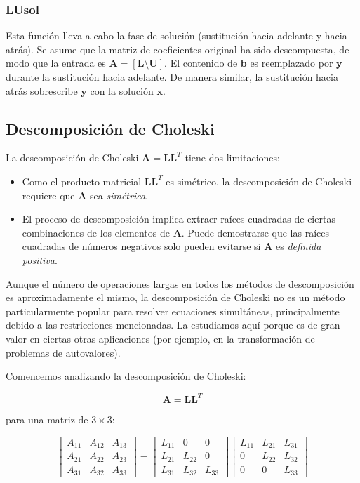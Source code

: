 \documentclass[12pt,letterpaper]{article}
\theoremstyle{definition}
\theoremstyle{plain}
\theoremstyle{remark}
\begin{document}
\subsubsection{LUsol}
Esta función lleva a cabo la fase de solución (sustitución hacia adelante y hacia atrás). Se asume que la matriz de coeficientes original ha sido descompuesta, de modo que la entrada es $\mathbf{A} = [\mathbf{L} \setminus \mathbf{U}]$. El contenido de $\mathbf{b}$ es reemplazado por $\mathbf{y}$ durante la sustitución hacia adelante. De manera similar, la sustitución hacia atrás sobrescribe $\mathbf{y}$ con la solución $\mathbf{x}$.



\subsection{Descomposición de Choleski}

La descomposición de Choleski $\mathbf{A} = \mathbf{L}\mathbf{L}^T$ tiene dos limitaciones:

\begin{itemize}
  \item Como el producto matricial $\mathbf{L}\mathbf{L}^T$ es simétrico, la descomposición de Choleski requiere que $\mathbf{A}$ sea \textit{simétrica}.
  \item El proceso de descomposición implica extraer raíces cuadradas de ciertas combinaciones de los elementos de $\mathbf{A}$. Puede demostrarse que las raíces cuadradas de números negativos solo pueden evitarse si $\mathbf{A}$ es \textit{definida positiva}.
\end{itemize}

Aunque el número de operaciones largas en todos los métodos de descomposición es aproximadamente el mismo, la descomposición de Choleski no es un método particularmente popular para resolver ecuaciones simultáneas, principalmente debido a las restricciones mencionadas. La estudiamos aquí porque es de gran valor en ciertas otras aplicaciones (por ejemplo, en la transformación de problemas de autovalores).

Comencemos analizando la descomposición de Choleski:

\[
\mathbf{A} = \mathbf{L}\mathbf{L}^T
\tag{1.10}
\]

para una matriz de $3 \times 3$:

\[
\begin{bmatrix}
A_{11} & A_{12} & A_{13} \\
A_{21} & A_{22} & A_{23} \\
A_{31} & A_{32} & A_{33}
\end{bmatrix}
=
\begin{bmatrix}
L_{11} & 0 & 0 \\
L_{21} & L_{22} & 0 \\
L_{31} & L_{32} & L_{33}
\end{bmatrix}
\begin{bmatrix}
L_{11} & L_{21} & L_{31} \\
0 & L_{22} & L_{32} \\
0 & 0 & L_{33}
\end{bmatrix}
\]
\end{document}
